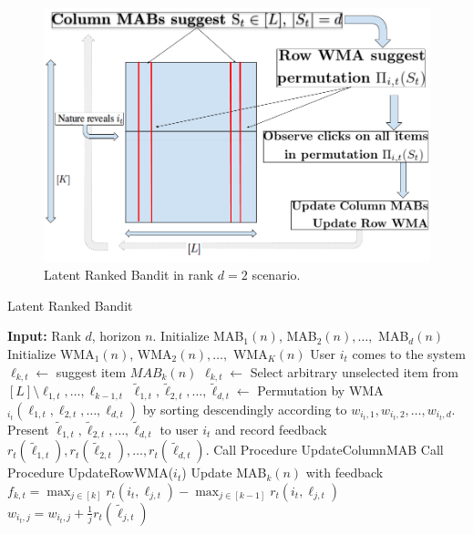 \begin{figure}[!th]
    \includegraphics[scale=0.2]{img/RankedBand.png}
    \caption{Latent Ranked Bandit in rank $d=2$ scenario.}
    \label{fig:rankedbandit}
    \vspace*{-1em}
\end{figure}

\begin{algorithm}
\caption{Latent Ranked Bandit}
\label{alg:latent-rank}
  \begin{algorithmic}[1]
  \State \textbf{Input:} Rank $d$, horizon $n$.
  \State Initialize MAB$_1(n)$, MAB$_2(n), \dots,$ MAB$_d(n)$
  \State Initialize WMA$_1(n)$, WMA$_2(n), \dots,$ WMA$_K(n)$
      \State User $i_t$ comes to the system
      \State ${\ell}_{k,t} \leftarrow$ suggest item $MAB_k(n)$
      \State ${\ell}_{k,t} \leftarrow$ Select arbitrary unselected item from $[L]\setminus \ell_{1, t},\dots,\ell_{k-1, t}$
      \EndIf
      \EndFor
      \State $\tilde{\ell}_{1,t},\tilde{\ell}_{2,t},\dots,\tilde{\ell}_{d,t}\leftarrow$ Permutation by WMA$_{i_t}(\ell_{1,t},\ell_{2,t},\dots,\ell_{d,t})$ by sorting descendingly according to $w_{i_t,1},w_{i_t,2},\dots,w_{i_t,d}$.
      \State Present $\tilde{\ell}_{1,t},\tilde{\ell}_{2,t},\dots,\tilde{\ell}_{d,t}$ to user $i_t$ and record feedback $r_{t}(\tilde{\ell}_{1,t}), r_{t}(\tilde{\ell}_{2,t}),\dots,r_{t}(\tilde{\ell}_{d,t})$.
      \State Call Procedure UpdateColumnMAB
      \State Call Procedure UpdateRowWMA($i_t$)
    \EndFor
    \State Update MAB$_k(n)$ with feedback $f_{k,t} = \max_{j\in [k]} r_t(i_t, \ell_{j,t}) - \max_{j\in [k-1]} r_t(i_t,\ell_{j,t})$
    \EndFor
\EndProcedure
{}
    \State $w_{i_t,j} = w_{i_t,j} + \frac{1}{j}r_{t}(\tilde{\ell}_{j,t})$
    \EndFor
\EndProcedure
  \end{algorithmic}
\end{algorithm}